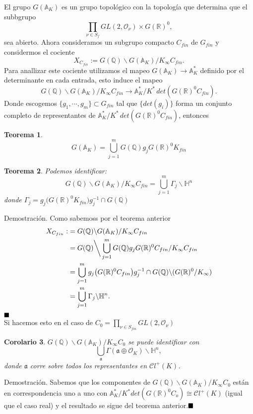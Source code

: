 \documentclass[letterpaper]{report}
\newtheorem{teorema}{Teorema}[chapter]
\newtheorem{cor}[teorema]{Corolario}
\newcommand{\dem}{{\sc Demostraci\'on. }}
\newcommand{\rac}{\ensuremath{ \mathbb Q }}
\newcommand{\re}{\ensuremath{\mathbb R }}
\newcommand{\Oan}{\ensuremath{\mathcal{O}}}
\newcommand{\Ad}{\ensuremath{\mathbb{A}}}
\newcommand{\hip}{\ensuremath{\mathbb H}}
\newcommand{\ga}{\ensuremath{\Gamma}}
\newcommand{\qed}{\ensuremath{\hspace*{0em plus 1fill}\blacksquare}}
\begin{document}
El grupo $G(\Ad_K)$ es un grupo topológico con la topología que determina que el subbgrupo
$$
	\prod_{\nu\in S_f}GL(2,\Oan_{\nu})\times G(\re)^0,
$$
sea abierto. Ahora consideramos un subgrupo compacto $C_{fin}$ de $G_{fin}$ y considermos el cociente
$$
	X_{C_{fin}}:=G(\rac)\backslash G(\Ad_K)/K_{\infty}C_{fin}.
$$
Para anallizar este cociente utilizamos el mapeo $G(\Ad_K)\rightarrow\Ad^*_{K}$ definido por el determinante en cada entrada, esto induce el mapeo
$$
	G(\rac)\backslash G(\Ad_K)/K_{\infty}C_{fin}\rightarrow\Ad^*_K/K^*\,det(G(\re)^0C_{fin}).
$$
Donde escogemos $\lbrace g_1,\cdots,g_m\rbrace\subset G_{fin}$ tal que $\lbrace det(g_i)\rbrace$ forma un conjunto completo de representantes de $\Ad^*_K/K^*\,det(G(\re)^0C_{fin})$, entonces
\begin{teorema}
\begin{equation}
G(\Ad_K)=\bigcup_{j=1}^m G(\rac)g_jG(\re)^0K_{fin}
\end{equation}
\end{teorema}
\begin{teorema}
Podemos identificar:
\begin{equation}
	G(\rac)\backslash G(\Ad_K)/K_{\infty}C_{fin}=\bigcup^m_{j=1}\ga_j\backslash\hip^n
\end{equation}
donde $\ga_j=g_j\big(G(\re)^0K_{fin}\big)g_j^{-1}\cap G(\rac)$ 
\end{teorema}
\dem Como sabemoss por el teorema anterior
\begin{align}
	X_{C_{fin}}:&=G(\rac)\backslash G(\Ad_K)/K_{\infty}C_{fin}\\
				&=G(\rac)\bigg\backslash\bigcup_{j=1}^mG(\rac)g_jG(\re)^0C_{fin}/K_{\infty}C_{fin}\\
				&=\bigcup^m_{j=1}g_j\big(G(\re)^0C_{fin}\big)g_j^{-1}\cap G(\rac)\backslash(G(\re)^0/K_{\infty})\\
				&=\bigcup^m_{j=1}\ga_j\backslash\hip^n.
\end{align}\qed\\
Si hacemos esto en el caso de $C_0=\prod_{\nu\in S_{fin}}GL(2,\Oan_{\nu})$
\begin{cor}
$G(\rac)\backslash G(\Ad_K)/K_{\infty}C_0$ se puede identificar con
$$
\bigcup_{\mathfrak{a}}\ga(\mathfrak{a}\oplus\Oan_K)\backslash\hip^n,
$$
\noindent donde $\mathfrak{a}$ corre sobre todos los representantes en $\mathcal{C}l^{+}(K)$.
\end{cor}
\dem Sabemos que los componentes de $G(\rac)\backslash G(\Ad_K)/K_{\infty}C_0$ están en correspondencia uno a uno con $\Ad_K^*/K^*det(G(\re)^0C_o)\cong\mathcal{C}l^{+}(K)$ (igual que el caso real) y el resultado se sigue del teorema anterior.\qed 
\end{document}
